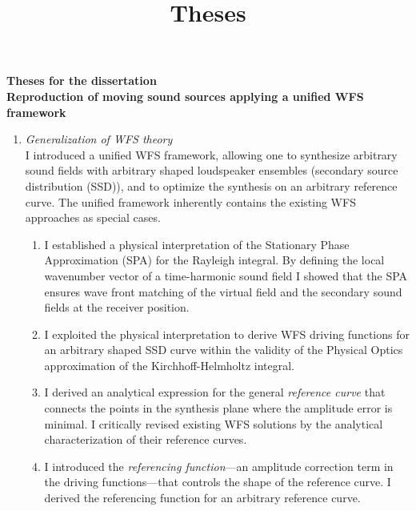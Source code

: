 \documentclass[a4paper,10pt]{article}
\title{Theses}
\date{}
\begin{document}
\begin{center}
  \textbf{\normalsize Theses for the dissertation \\
   		  \Large Reproduction of moving sound sources applying a unified WFS framework}\\[0.5cm]
\end{center}

\begin{enumerate}
\item \emph{Generalization of WFS theory} \\ 
I introduced a unified WFS framework, allowing one to synthesize arbitrary sound fields with arbitrary shaped loudspeaker ensembles (secondary source distribution (SSD)), and to optimize the synthesis on an arbitrary reference curve. 
The unified framework inherently contains the existing WFS approaches as special cases.
\begin{enumerate}
\item \label{th:SPAinterpret} I established a physical interpretation of the Stationary Phase Approximation (SPA) for the Rayleigh integral.
By defining the local wavenumber vector of a time-harmonic sound field I showed that the SPA ensures wave front matching of the virtual field and the secondary sound fields at the receiver position.
\item I exploited the physical interpretation to derive WFS driving functions for an arbitrary shaped SSD curve within the validity of the Physical Optics approximation of the Kirchhoff-Helmholtz integral.
\item
I derived an analytical expression for the general \emph{reference curve} that connects the points in the synthesis plane where the amplitude error is minimal.
I critically revised existing WFS solutions by the analytical characterization of their reference curves.
\item I introduced the \emph{referencing function}---an amplitude correction term in the driving functions---that controls the shape of the reference curve.
I derived the referencing function for an arbitrary reference curve.

\end{enumerate}
\end{enumerate}
\end{document}
